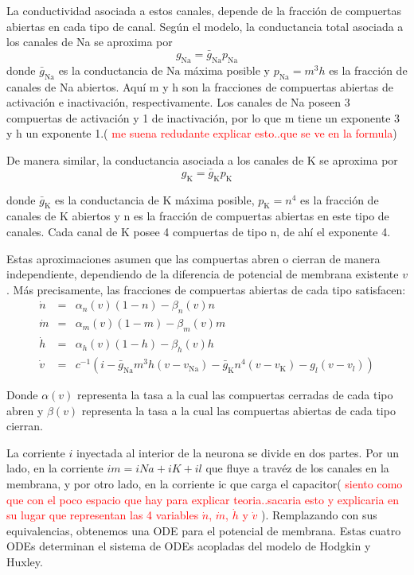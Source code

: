 \documentclass[aps,prl,twocolumn,groupedaddress]{revtex4-2}
\begin{document}
La conductividad asociada a estos canales, depende de la fracción de compuertas abiertas en cada tipo de canal. Según el modelo, la conductancia total asociada a los canales de Na se aproxima por
$$g_{\mathrm{Na}} = \bar{g}_{\mathrm{Na}}p_{\mathrm{Na}}$$
donde $\bar{g}_{\mathrm{Na}}$ es la conductancia de $\mathrm{Na}$ máxima posible y $p_{\mathrm{Na}} = m^3h$  es la fracción de canales de Na abiertos. Aquí m y h son la fracciones de compuertas abiertas de activación e inactivación, respectivamente. Los canales de Na poseen 3 compuertas de activación y 1 de inactivación, por lo que m tiene un exponente 3 y h un exponente 1.( \textcolor{red}{me suena redudante explicar esto..que se ve en la formula})

De manera similar, la conductancia asociada a los canales de K se aproxima por 
$$g_{\mathrm{K}} = \bar{g}_{\mathrm{K}}p_{\mathrm{K}}$$ 

donde $\bar{g}_{\mathrm{K}}$  es la conductancia de K máxima posible, $p_{\mathrm{K}} = n^4$ es la fracción de canales de K abiertos y n es la fracción de compuertas abiertas en este tipo de canales. Cada canal de K posee 4 compuertas de tipo n, de ahí el exponente 4.

Estas aproximaciones asumen que las compuertas abren o cierran de manera independiente, dependiendo de la diferencia de potencial de membrana existente $v$. Más precisamente, las fracciones de compuertas abiertas de cada tipo satisfacen:
\begin{eqnarray*}
\dot{n}&=&\alpha_n(v)(1-n)-\beta_n(v) n\\
\dot{m}&=&\alpha_m(v)(1-m)-\beta_m(v) m\\
\dot{h}&=&\alpha_h(v)(1-h)-\beta_h(v) h\\
\dot{v}&=&c^{-1}(i-\bar{g}_{\mathrm{Na}}m^3h(v-v_{\mathrm{Na}})-\bar{g}_{\mathrm{K}}n^4(v-v_{\mathrm{K}})-g_{l}(v-v_{l}))
\end{eqnarray*}

Donde $\alpha(v)$ representa la tasa a la cual las compuertas cerradas de cada tipo abren y $\beta(v)$ representa la tasa a la cual las compuertas abiertas de cada tipo cierran.

La corriente $i$ inyectada al interior de la neurona se divide en dos partes. Por un lado, en la corriente  $im=iNa+iK+il$  que fluye a travéz de los canales en la membrana, y por otro lado, en la corriente  ic  que carga el capacitor( \textcolor{red}{siento como que con el poco espacio que hay para explicar teoria..sacaria esto y explicaria en su lugar que representan las 4 variables $\dot{n}$, $\dot{m}$, $\dot{h}$ y $\dot{v}$ }).
Remplazando con sus equivalencias, obtenemos una ODE para el potencial de membrana.
Estas cuatro ODEs determinan el sistema de ODEs acopladas del modelo de Hodgkin y Huxley.
\end{document}
